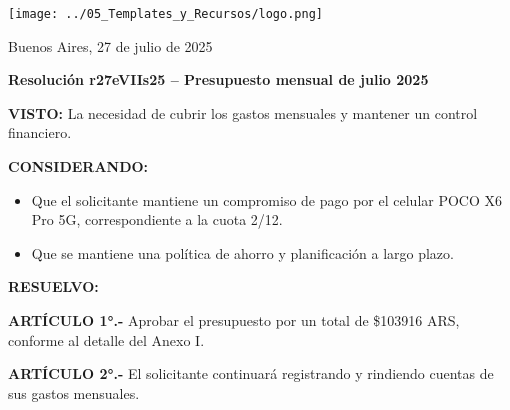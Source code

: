 \documentclass[12pt]{article}
\begin{document}
\begin{minipage}{0.3\textwidth}
  \vspace{-0.6cm}
  \texttt{[image: ../05\_Templates\_y\_Recursos/logo.png]}
\end{minipage}
\hfill
\begin{minipage}{0.65\textwidth}
  \begin{flushright}
    Buenos Aires, 27 de julio de 2025
  \end{flushright}
\end{minipage}

\vspace{1cm}

\begin{center}
  \textbf{\large Resolución r27eVIIs25 – Presupuesto mensual de julio 2025}
\end{center}

\vspace{0.8cm}

\textbf{VISTO:}
La necesidad de cubrir los gastos mensuales y mantener un control financiero.

\vspace{0.4cm}

\textbf{CONSIDERANDO:}
\begin{itemize}
  
    
  
    
  
    
  \item Que el solicitante mantiene un compromiso de pago por el celular POCO X6 Pro 5G, correspondiente a la cuota 2/12.
    
  
    
  \item Que se mantiene una política de ahorro y planificación a largo plazo.
    
  
\end{itemize}

\vspace{0.4cm}

\textbf{RESUELVO:}

\textbf{ARTÍCULO 1°.-}
Aprobar el presupuesto por un total de \$103916 ARS, conforme al detalle del Anexo I.
\vspace{0.5cm}

\textbf{ARTÍCULO 2°.-}
El solicitante continuará registrando y rindiendo cuentas de sus gastos mensuales.
\vspace{0.5cm}
\end{document}
